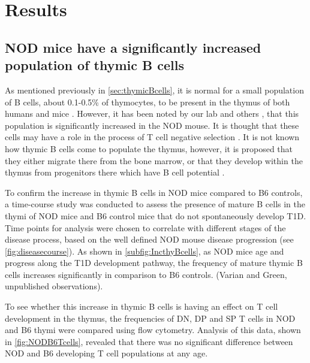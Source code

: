 
\chapter{Results}




\section{NOD mice have a significantly increased population of thymic B cells}

As mentioned previously in \cref{sec:thymicBcells}, it is normal for a small population of B cells, about 0.1-0.5\% of thymocytes, to be present in the thymus of both humans and mice \citep{Perera2013}.
However, it has been noted by our lab and others \citep{OReilly1994, Serreze1998}, that this population is significantly increased in the NOD mouse.
It is thought that these cells may have a role in the process of T cell negative selection \citep{Starr2003, Perera2013}.
It is not known how thymic B cells come to populate the thymus, however, it is proposed that they either migrate there from the bone marrow, or that they develop within the thymus from progenitors there which have B cell potential \citep{Perera2013}.

To confirm the increase in thymic B cells in NOD mice compared to B6 controls, a time-course study was conducted to assess the presence of mature B cells in the thymi of NOD mice and B6 control mice that do not spontaneously develop T1D.
Time points for analysis were chosen to correlate with different stages of the disease process, based on the well defined NOD mouse disease progression (see \cref{fig:diseasecourse}).
As shown in \cref{subfig:IncthyBcells}, as NOD mice age and progress along the T1D development pathway, the frequency of mature thymic B cells increases significantly in comparison to B6 controls. (Varian and Green, unpublished observations).

To see whether this increase in thymic B cells is having an effect on T cell development in the thymus, the frequencies of DN, DP and SP T cells in NOD and B6 thymi were compared using flow cytometry.
Analysis of this data, shown in \cref{fig:NODB6Tcells}, revealed that there was no significant difference between NOD and B6 developing T cell populations at any age.


